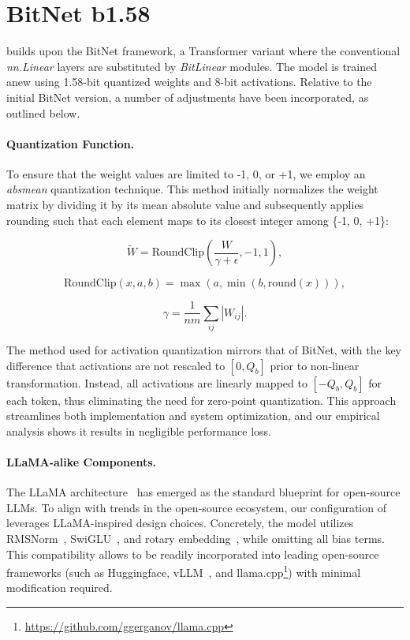 \section{BitNet b1.58}

 builds upon the BitNet framework, a Transformer variant where the conventional \emph{nn.Linear} layers are substituted by \emph{BitLinear} modules. The model is trained anew using 1.58-bit quantized weights and 8-bit activations. Relative to the initial BitNet version, a number of adjustments have been incorporated, as outlined below.

\paragraph{Quantization Function.} To ensure that the weight values are limited to -1, 0, or +1, we employ an \emph{absmean} quantization technique. This method initially normalizes the weight matrix by dividing it by its mean absolute value and subsequently applies rounding such that each element maps to its closest integer among \{-1, 0, +1\}:

\begin{equation}
    \widetilde{W} = \mathrm{RoundClip}(\frac{W}{\gamma + \epsilon}, -1, 1),
\end{equation}

\begin{equation}
    \mathrm{RoundClip}(x, a, b) = \max(a, \min(b, \mathrm{round}(x))),
\end{equation}

\begin{equation}
    \gamma = \frac{1}{nm}\sum_{ij} |W_{ij}|.
\end{equation}

The method used for activation quantization mirrors that of BitNet, with the key difference that activations are not rescaled to $[0, Q_b]$ prior to non-linear transformation. Instead, all activations are linearly mapped to $[-Q_b, Q_b]$ for each token, thus eliminating the need for zero-point quantization. This approach streamlines both implementation and system optimization, and our empirical analysis shows it results in negligible performance loss.

\paragraph{LLaMA-alike Components.}

The LLaMA architecture~\cite{llama, llama2} has emerged as the standard blueprint for open-source LLMs. To align with trends in the open-source ecosystem, our configuration of  leverages LLaMA-inspired design choices. Concretely, the model utilizes RMSNorm~\cite{rmsnorm}, SwiGLU~\cite{swiglu}, and rotary embedding~\cite{rope}, while omitting all bias terms. This compatibility allows  to be readily incorporated into leading open-source frameworks (such as Huggingface, vLLM~\cite{vllm}, and llama.cpp\footnote{\url{https://github.com/ggerganov/llama.cpp}}) with minimal modification required.

